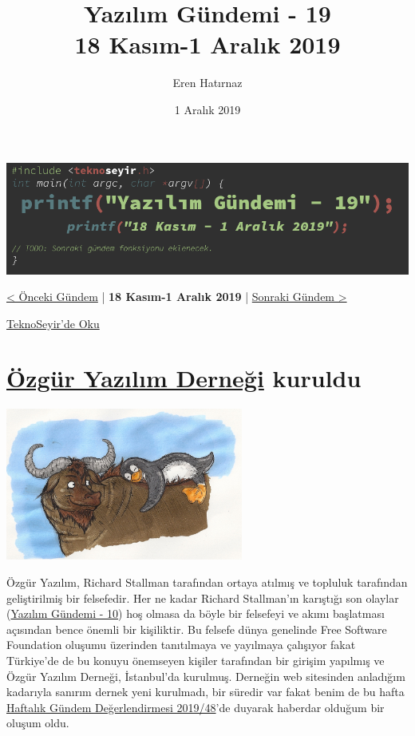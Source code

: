\documentclass[11pt]{article}
\author{Eren Hatırnaz}
\date{1 Aralık 2019}
\title{Yazılım Gündemi - 19\\\medskip
\large 18 Kasım-1 Aralık 2019}
\begin{document}
\maketitle
\tableofcontents \clearpage\shorthandoff{=}

\begin{center}
\includegraphics[width=.9\linewidth]{gorseller/yazilim-gundemi-banner.png}
\end{center}

\begin{center}
\href{../18/yazilim-gundemi-18.pdf}{< Önceki Gündem} | \textbf{18 Kasım-1 Aralık 2019} | \href{../20/yazilim-gundemi-20.pdf}{Sonraki Gündem >}

\href{https://teknoseyir.com/blog/yazilim-gundemi-19-18-kasim-1-aralik-2019}{TeknoSeyir'de Oku}
\end{center}

\section{\href{https://www.oyd.org.tr/}{Özgür Yazılım Derneği} kuruldu}
\label{sec:orgb45fa56}
\begin{center}
\includegraphics[height=5cm]{gorseller/ozgur-yazilim-dernegi.jpg}
\end{center}

Özgür Yazılım, Richard Stallman tarafından ortaya atılmış ve topluluk
tarafından geliştirilmiş bir felsefedir. Her ne kadar Richard Stallman'ın
karıştığı son olaylar (\href{../10/yazilim-gundemi-10.pdf}{Yazılım Gündemi - 10}) hoş olmasa da böyle bir felsefeyi
ve akımı başlatması açısından bence önemli bir kişiliktir. Bu felsefe dünya
genelinde Free Software Foundation oluşumu üzerinden tanıtılmaya ve yayılmaya
çalışıyor fakat Türkiye'de de bu konuyu önemseyen kişiler tarafından bir
girişim yapılmış ve Özgür Yazılım Derneği, İstanbul'da kurulmuş. Derneğin web
sitesinden anladığım kadarıyla sanırım dernek yeni kurulmadı, bir süredir var
fakat benim de bu hafta \href{https://teknoseyir.com/haftalik-gundem-degerlendirmesi-2019-48}{Haftalık Gündem Değerlendirmesi 2019/48}'de duyarak
haberdar olduğum bir oluşum oldu.
\end{document}
